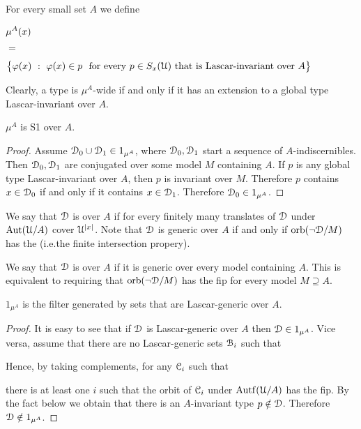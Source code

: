 \documentclass{amsproc}
\renewcommand*{\emph}[1]{%
   \smash{\tikz[baseline]\node[rectangle, fill=teal!25, rounded corners, inner xsep=0.5ex, inner ysep=0.2ex, anchor=base, minimum height = 2.7ex]{\strut #1};}}
\begin{document}
For every small set $A$ we define

{\def\ceq#1#2#3{\parbox[t]{10ex}{$\displaystyle #1$}\parbox{6ex}{\hfil $#2$}{$\displaystyle #3$}}
\ceq{\hfill\mu^A(x)}{=}{\big\{\varphi(x)\ :\ \varphi(x)\in p\ {\rm\ for\ every\ }p\in S_x(\EuScript U)\ \textrm{that is Lascar-invariant over}\ A\big\}}}

Clearly, a type is $\mu^A$-wide if and only if it has an extension to a global type Lascar-invariant over $A$.

\begin{lemma}
  $\mu^A$ is S1 over $A$.
\end{lemma}  

\begin{proof}
  Assume $\EuScript D_0\cup\EuScript D_1\in1_{\mu^A}$, where $\EuScript D_0,\EuScript D_1$ start a sequence of $A$-indiscernibles.
  Then $\EuScript D_0,\EuScript D_1$ are conjugated over some model $M$ containing $A$.
  If $p$ is any global type Lascar-invariant over $A$, then $p$ is invariant over $M$.
  Therefore $p$ contains $x\in\EuScript D_0$ if and only if it contains $x\in\EuScript D_1$.
  Therefore $\EuScript D_0\in1_{\mu^A}$.
\end{proof}

We say that $\EuScript D$ is \emph{generic\/} over $A$ if for every finitely many translates of $\EuScript D$ under ${\rm Aut}(\EuScript U/A)$ cover $\EuScript U^{|x|}$.
Note that $\EuScript D$ is generic over $A$ if and only if  ${\rm orb}(\neg\EuScript D/M)$ has the \emph{fip\/} (i.e.\@ the finite intersection propery).

We say that $\EuScript D$ is \emph{Lascar-generic\/} over $A$ if it is generic over every model containing $A$.
This is equivalent to requiring that ${\rm orb}(\neg\EuScript D/M)$ has the fip for every model $M\supseteq A$.

\begin{fact}
  $1_{\mu^A}$ is the filter generated by sets that are Lascar-generic over $A$.
\end{fact}
  
\begin{proof}
  It is easy to see that if $\EuScript D$ is Lascar-generic over $A$ then $\EuScript D\in1_{\mu^A}$.
  Vice versa, assume that there are no Lascar-generic sets $\EuScript B_i$ such that 


  Hence, by taking complements, for any $\EuScript C_i$ such that 
  

  there is at least one $i$ such that the orbit of $\EuScript C_i$ under ${\rm Autf}(\EuScript U/A)$ has the fip.
  By the fact below we obtain that there is an $A$-invariant type $p\notin\EuScript D$.
  Therefore $\EuScript D\notin1_{\mu^A}$.
\end{proof}
\end{document}
